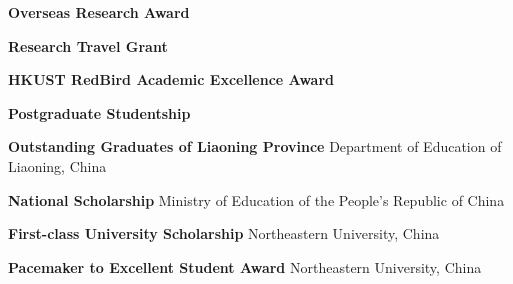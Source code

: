\documentclass[localFont,alternative]{documentMETADATA}
\begin{document}

\begin{scholarship}
	{\textbf{Overseas Research Award}}

	{\textbf{Research Travel Grant}}

	{\textbf{HKUST RedBird Academic Excellence Award}}

	{\textbf{Postgraduate Studentship}}

	{\textbf{Outstanding Graduates of Liaoning Province}}
	\scholarshipentry{}
	{Department of Education of Liaoning, China}

	{\textbf{National Scholarship}}
	\scholarshipentry{}
	{Ministry of Education of the People's Republic of China}

	{\textbf{First-class University Scholarship}}
	\scholarshipentry{}
	{Northeastern University, China}

	{\textbf{Pacemaker to Excellent Student Award}}
	\scholarshipentry{}
	{Northeastern University, China}

\end{scholarship}
\end{document}
